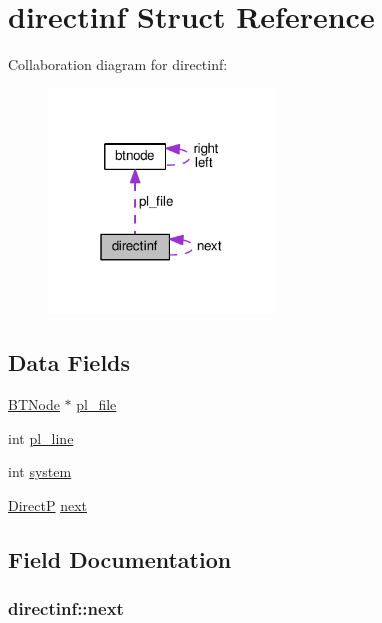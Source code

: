 \hypertarget{structdirectinf}{}\section{directinf Struct Reference}
\label{structdirectinf}


Collaboration diagram for directinf\+:\nopagebreak
\begin{figure}[H]
\begin{center}
\leavevmode
\includegraphics[width=171pt]{structdirectinf__coll__graph}
\end{center}
\end{figure}
\subsection*{Data Fields}
\begin{DoxyCompactItemize}
\item 
\hyperlink{bt__string_8h_a94e2311ccccb66fae2c4ce55649526fc}{B\+T\+Node} $\ast$ \hyperlink{structdirectinf_a2d00b2ef3ca0317b568b16ed20968e52}{pl\+\_\+file}
\item 
int \hyperlink{structdirectinf_ae817c137ec2f80b2a6409ae0ca8faa7a}{pl\+\_\+line}
\item 
int \hyperlink{structdirectinf_a328d981a0d78b287ff7494df8d501635}{system}
\item 
\hyperlink{wam2ma_8c_a2234cb6f0b53475c304478e9e4b6ea2a}{DirectP} \hyperlink{structdirectinf_a6376c34c77718e3ea148063383fd29da}{next}
\end{DoxyCompactItemize}


\subsection{Field Documentation}
\subsubsection[{\texorpdfstring{next}{next}}]{ directinf\+::next}\hypertarget{structdirectinf_a6376c34c77718e3ea148063383fd29da}{}\label{structdirectinf_a6376c34c77718e3ea148063383fd29da}
